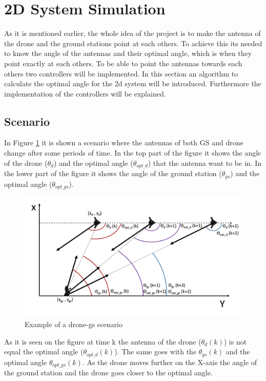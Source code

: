 \newpage
\section{2D System Simulation}\label{sec:2d_sim}
As it is mentioned earlier, the whole idea of the project is to make the antenna of the drone and the ground stations point at each others. To achieve this its needed to know the angle of the antennas and their optimal angle, which is when they point exactly at each others. To be able to point the antennas towards each others two controllers will be implemented. In this section an algorithm to calculate the optimal angle for the 2d system will be introduced. Furthermore the implementation of the controllers will be explained.
\subsection{Scenario}
In Figure \ref{fig:drone_gs} it is shown a scenario where the antennas of both GS and drone change after some periods of time. In the top part of the figure it shows the angle of the drone ($\theta_{d}$) and the optimal angle ($\theta_{opt\_d}$) that the antenna want to be in. In the lower part of the figure it shows the angle of the ground station ($\theta_{gs}$) and the optimal angle ($\theta_{opt\_gs}$). 

\begin{figure}[h]
	\centering
	
	\includegraphics[scale=0.45]{figures/drone_gs_ex_1.jpg}
	\caption{Example of a drone-gs scenario}
	\label{fig:drone_gs}
\end{figure}

As it is seen on the figure at time k the antenna of the drone ($\theta_d (k)$) is not equal the optimal angle ($\theta_{opt\_d}(k)$). The same goes with the $\theta_{gs}(k)$ and the optimal angle $\theta_{opt\_gs}(k)$. As the drone moves further on the X-axis the angle of the ground station and the drone goes closer to the optimal angle. 

